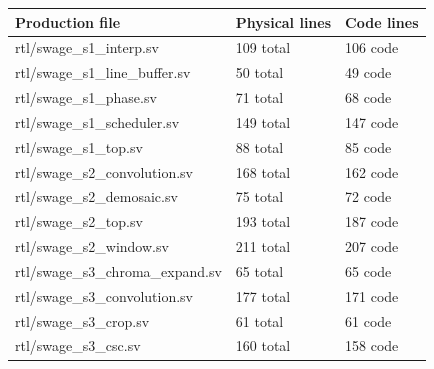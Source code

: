 \documentclass[11pt,a4paper]{article}
\begin{document}
{\small\renewcommand{\arraystretch}{1.18}\begin{longtable}{@{}L{0.55\textwidth}|L{0.18\textwidth}|L{0.18\textwidth}@{}}\toprule

\textbf{Production file} & \textbf{Physical lines} & \textbf{Code lines}\\\midrule\endhead

rtl/\allowbreak{}swage\_\allowbreak{}s1\_\allowbreak{}interp.sv & 109 total & 106 code\\[2pt]\hline

rtl/\allowbreak{}swage\_\allowbreak{}s1\_\allowbreak{}line\_\allowbreak{}buffer.sv & 50 total & 49 code\\[2pt]\hline

rtl/\allowbreak{}swage\_\allowbreak{}s1\_\allowbreak{}phase.sv & 71 total & 68 code\\[2pt]\hline

rtl/\allowbreak{}swage\_\allowbreak{}s1\_\allowbreak{}scheduler.sv & 149 total & 147 code\\[2pt]\hline

rtl/\allowbreak{}swage\_\allowbreak{}s1\_\allowbreak{}top.sv & 88 total & 85 code\\[2pt]\hline

rtl/\allowbreak{}swage\_\allowbreak{}s2\_\allowbreak{}convolution.sv & 168 total & 162 code\\[2pt]\hline

rtl/\allowbreak{}swage\_\allowbreak{}s2\_\allowbreak{}demosaic.sv & 75 total & 72 code\\[2pt]\hline

rtl/\allowbreak{}swage\_\allowbreak{}s2\_\allowbreak{}top.sv & 193 total & 187 code\\[2pt]\hline

rtl/\allowbreak{}swage\_\allowbreak{}s2\_\allowbreak{}window.sv & 211 total & 207 code\\[2pt]\hline

rtl/\allowbreak{}swage\_\allowbreak{}s3\_\allowbreak{}chroma\_\allowbreak{}expand.sv & 65 total & 65 code\\[2pt]\hline

rtl/\allowbreak{}swage\_\allowbreak{}s3\_\allowbreak{}convolution.sv & 177 total & 171 code\\[2pt]\hline

rtl/\allowbreak{}swage\_\allowbreak{}s3\_\allowbreak{}crop.sv & 61 total & 61 code\\[2pt]\hline

rtl/\allowbreak{}swage\_\allowbreak{}s3\_\allowbreak{}csc.sv & 160 total & 158 code\\[2pt]\hline


\end{longtable}}
\end{document}
